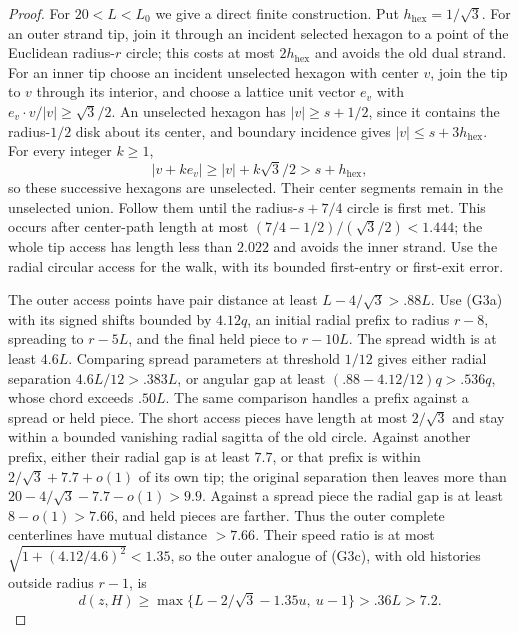 \begin{proof}
For \(20<L<L_0\) we give a direct finite construction.  Put
\(h_{\mathrm{hex}}=1/\sqrt3\).  For an outer strand tip, join it through an
incident selected hexagon to a point of the Euclidean radius-\(r\) circle;
this costs at most \(2h_{\mathrm{hex}}\) and avoids the old dual strand.  For
an inner tip choose an incident unselected hexagon with center \(v\),
join the tip to \(v\) through its interior, and choose a lattice unit
vector \(e_v\) with \(e_v\cdot v/|v|\ge\sqrt3/2\).  An unselected
hexagon has \(|v|\ge s+1/2\), since it contains the radius-\(1/2\) disk
about its center, and boundary incidence gives \(|v|\le s+3h_{\mathrm{hex}}\).
For every integer \(k\ge1\),
\[
 |v+ke_v|\ge |v|+k\sqrt3/2>s+h_{\mathrm{hex}},
\]
so these successive hexagons are unselected.  Their center segments
remain in the unselected union.  Follow them until the radius-\(s+7/4\)
circle is first met.  This occurs after center-path length at most
\((7/4-1/2)/(\sqrt3/2)<1.444\); the whole tip access has length less
than \(2.022\) and avoids the inner strand.  Use the radial circular
access for the walk, with its bounded first-entry or first-exit error.

The outer access points have pair distance at least
\(L-4/\sqrt3>.88L\).  Use (G3a) with its signed shifts bounded by
\(4.12q\), an initial radial prefix to radius \(r-8\), spreading to
\(r-5L\), and the final held piece to \(r-10L\).  The spread width is
at least \(4.6L\).  Comparing spread parameters at threshold \(1/12\)
gives either radial separation \(4.6L/12>.383L\), or angular gap at
least \((.88-4.12/12)q>.536q\), whose chord exceeds \(.50L\).
The same comparison handles a prefix against a spread or held piece.
The short access pieces have length at most \(2/\sqrt3\) and stay within
a bounded vanishing radial sagitta of the old circle.  Against another
prefix, either their radial gap is at least \(7.7\), or that prefix is
within \(2/\sqrt3+7.7+o(1)\) of its own tip; the original separation then
leaves more than \(20-4/\sqrt3-7.7-o(1)>9.9\).  Against a spread piece
the radial gap is at least \(8-o(1)>7.66\), and held pieces are farther.
Thus the outer complete centerlines have mutual distance \(>7.66\).
Their speed ratio is at most \(\sqrt{1+(4.12/4.6)^2}<1.35\), so the
outer analogue of (G3c), with old histories outside radius \(r-1\), is
\[
 d(z,H)\ge\max\{L-2/\sqrt3-1.35u,\ u-1\}>.36L>7.2.       \tag{G3i}
\]


\end{proof}
